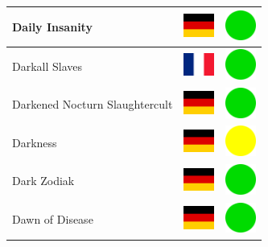 \documentclass[12pt, a4paper, twoside]{report}
\begin{document}
\begin{center}
\begin{longtable}{|p{5cm}|p{2cm}|p{2cm}|}
Daily Insanity & \includegraphics[width=1cm]{4x3/de} & \includegraphics[width=1cm]{likes/y} \\ \hline
Darkall Slaves & \includegraphics[width=1cm]{4x3/fr} & \includegraphics[width=1cm]{likes/y} \\ \hline
Darkened Nocturn Slaughtercult & \includegraphics[width=1cm]{4x3/de} & \includegraphics[width=1cm]{likes/y} \\ \hline
Darkness & \includegraphics[width=1cm]{4x3/de} & \includegraphics[width=1cm]{likes/m} \\ \hline
Dark Zodiak & \includegraphics[width=1cm]{4x3/de} & \includegraphics[width=1cm]{likes/y} \\ \hline
Dawn of Disease & \includegraphics[width=1cm]{4x3/de} & \includegraphics[width=1cm]{likes/y} \\ \hline

\end{longtable}
\end{center}
\end{document}
